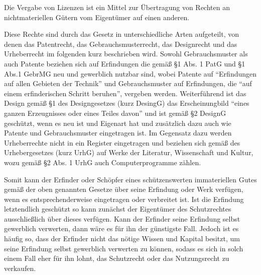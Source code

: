 Die Vergabe von Lizenzen ist ein Mittel zur Übertragung von Rechten an nichtmateriellen Gütern vom Eigentümer auf einen anderen. 

Diese Rechte sind durch das Gesetz in unterschiedliche Arten aufgeteilt, von denen das Patentrecht, das Gebrauchsmusterrecht, das Designrecht und das Urheberrecht im folgenden kurz beschrieben wird.
Sowohl Gebrauchsmuster als auch Patente beziehen sich auf Erfindungen die gemäß §1 Abs. 1 PatG und §1 Abs.1 GebrMG neu und gewerblich nutzbar sind,
wobei Patente auf “Erfindungen auf allen Gebieten der Technik” und Gebrauchsmuster auf Erfindungen, die “auf einem erfinderischen Schritt beruhen”, vergeben werden.
Weiterführend ist das Design gemäß §1 des Designgesetzes (kurz DesingG) das Erscheinungbild “eines ganzen Erzeugnisses oder eines Teiles davon” und ist gemäß §2 DesignG geschützt,
wenn es neu ist und Eigenart hat und zusätzlich dazu auch wie Patente und Gebrauchsmuster eingetragen ist. Im Gegensatz dazu werden Urheberrechte nicht in ein Register eingetragen und
beziehen sich gemäß des Urhebergesetzes (kurz UrhG) auf Werke der Literatur, Wissenschaft und Kultur, wozu gemäß §2 Abs. 1 UrhG auch Computerprogramme zählen. 

Somit kann der Erfinder oder Schöpfer eines schützenswerten immateriellen Gutes gemäß der oben genannten Gesetze über seine Erfindung oder Werk verfügen,
wenn es entsprechenderweise eingetragen oder verbreitet ist. Ist die Erfindung letztendlich geschützt so kann zunächst der Eigentümer des Schutzrechtes ausschließlich über dieses verfügen.
Kann der Erfinder seine Erfindung selbst gewerblich verwerten, dann wäre es für ihn der günstigste Fall. Jedoch ist es häufig so, dass der Erfinder nicht das nötige Wissen und Kapital besitzt,
um seine Erfindung selbst gewerblich verwerten zu können, sodass es sich in solch einem Fall eher für ihn lohnt, das Schutzrecht oder das Nutzungsrecht zu verkaufen. 

